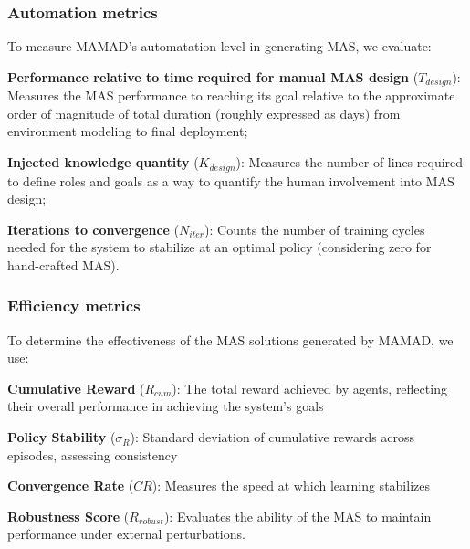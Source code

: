 \documentclass[pdflatex,sn-mathphys-num]{sn-jnl}%
\theoremstyle{thmstyleone}%
\theoremstyle{thmstyletwo}%
\theoremstyle{thmstylethree}%
\begin{document}
\subsubsection{Automation metrics}
To measure MAMAD's automatation level in generating MAS, we evaluate:
\begin{enumerate*}[label={\roman*)}, itemjoin={; \quad}]
    \item \textbf{Performance relative to time required for manual MAS design} ($T_{design}$): Measures the MAS performance to reaching its goal relative to the approximate order of magnitude of total duration (roughly expressed as days) from environment modeling to final deployment;
    \item \textbf{Injected knowledge quantity} ($K_{design}$): Measures the number of lines required to define roles and goals as a way to quantify the human involvement into MAS design;
    \item \textbf{Iterations to convergence} ($N_{iter}$): Counts the number of training cycles needed for the system to stabilize at an optimal policy (considering zero for hand-crafted MAS).
\end{enumerate*}

\subsubsection{Efficiency metrics}
To determine the effectiveness of the MAS solutions generated by MAMAD, we use:
\begin{enumerate*}[label={\roman*)}, itemjoin={; \quad}]
    \item \textbf{Cumulative Reward} ($R_{cum}$): The total reward achieved by agents, reflecting their overall performance in achieving the system's goals
    \item \textbf{Policy Stability} ($\sigma_R$): Standard deviation of cumulative rewards across episodes, assessing consistency
    \item \textbf{Convergence Rate} ($CR$): Measures the speed at which learning stabilizes
    \item \textbf{Robustness Score} ($R_{robust}$): Evaluates the ability of the MAS to maintain performance under external perturbations.
\end{enumerate*}
\end{document}
